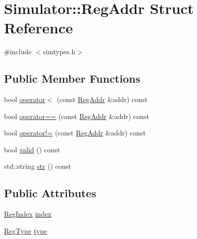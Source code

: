 \hypertarget{struct_simulator_1_1_reg_addr}{\section{Simulator\+:\+:Reg\+Addr Struct Reference}
\label{struct_simulator_1_1_reg_addr}
}


{\ttfamily \#include $<$simtypes.\+h$>$}

\subsection*{Public Member Functions}
\begin{DoxyCompactItemize}
\item 
bool \hyperlink{struct_simulator_1_1_reg_addr_ade0294c1f30e35a9def2c0979029d852}{operator$<$} (const \hyperlink{struct_simulator_1_1_reg_addr}{Reg\+Addr} \&addr) const 
\item 
bool \hyperlink{struct_simulator_1_1_reg_addr_a93a6fed4abc2d82b2f05fb1668a52384}{operator==} (const \hyperlink{struct_simulator_1_1_reg_addr}{Reg\+Addr} \&addr) const 
\item 
bool \hyperlink{struct_simulator_1_1_reg_addr_a75d201ce58b679793cc292c684777933}{operator!=} (const \hyperlink{struct_simulator_1_1_reg_addr}{Reg\+Addr} \&addr) const 
\item 
bool \hyperlink{struct_simulator_1_1_reg_addr_ab9a5c5b8cb06276b66da7ac73018493f}{valid} () const 
\item 
std\+::string \hyperlink{struct_simulator_1_1_reg_addr_a0e83d8c88851ab3101d4d7a16007564c}{str} () const 
\end{DoxyCompactItemize}
\subsection*{Public Attributes}
\begin{DoxyCompactItemize}
\item 
\hyperlink{namespace_simulator_ab00c9033de4c9a17db7b53d6c292515c}{Reg\+Index} \hyperlink{struct_simulator_1_1_reg_addr_ad49647b31c6f94d3a12e19642737e1cb}{index}
\item 
\hyperlink{namespace_simulator_ab86b74f4b95732ea63178d829b189acb}{Reg\+Type} \hyperlink{struct_simulator_1_1_reg_addr_afb5731a51c5bff55a2390f5a73daadc5}{type}
\end{DoxyCompactItemize}


